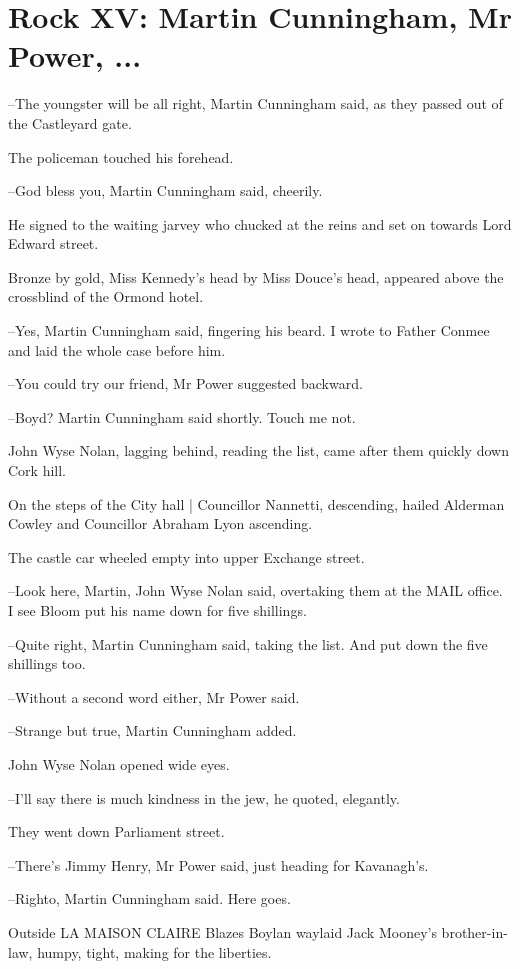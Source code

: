 \section*{Rock XV: Martin Cunningham, Mr Power, ...}


--The youngster will be all right,
Martin Cunningham said,
as they passed
out of the Castleyard gate.

The policeman touched his forehead.

--God bless you,
Martin Cunningham said, cheerily.

He signed to the waiting jarvey
who chucked at the reins and set on towards Lord Edward street.

Bronze by gold,
Miss Kennedy's head by Miss Douce's head,
appeared above
the crossblind of the Ormond hotel.

--Yes,
Martin Cunningham said,
fingering his beard.
I wrote to Father
Conmee and laid the whole case before him.

--You could try our friend,
Mr Power suggested backward.

--Boyd?
Martin Cunningham said shortly.
Touch me not.

John Wyse Nolan, lagging behind, reading the list,
came after them
quickly down Cork hill.

On the steps of the City hall |
Councillor Nannetti, descending,
hailed
Alderman Cowley and Councillor Abraham Lyon ascending.

The castle car wheeled empty into upper Exchange street.

--Look here, Martin,
John Wyse Nolan said,
overtaking them at the MAIL
office.
I see Bloom put his name down for five shillings.

--Quite right,
Martin Cunningham said,
taking the list.
And put down the
five shillings too.

--Without a second word either,
Mr Power said.

--Strange but true,
Martin Cunningham added.

John Wyse Nolan opened wide eyes.

--I'll say there is much kindness in the jew,
he quoted, elegantly.

They went down Parliament street.

--There's Jimmy Henry,
Mr Power said,
just heading for Kavanagh's.

--Righto,
Martin Cunningham said.
Here goes.

Outside LA MAISON CLAIRE
Blazes Boylan waylaid Jack Mooney's brother-in-
law,
humpy, tight,
making for the liberties.

